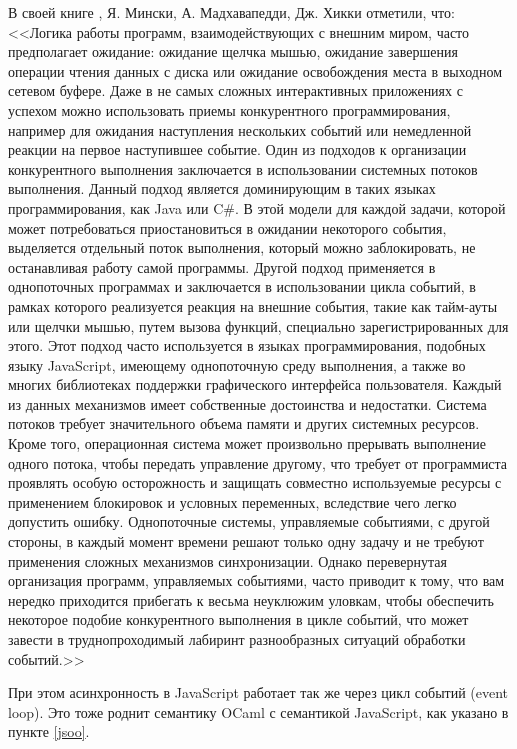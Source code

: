 В своей книге \cite{rwo-ru}, Я. Мински, А. Мадхавапедди, Дж. Хикки отметили, что:
<<Логика работы программ, взаимодействующих с внешним миром, часто предполагает
ожидание: ожидание щелчка мышью, ожидание завершения операции чтения
данных с диска или ожидание освобождения места в выходном сетевом буфере.
Даже в не самых сложных интерактивных приложениях с успехом можно использовать
приемы конкурентного программирования, например для ожидания наступления
нескольких событий или немедленной реакции на первое наступившее событие.
Один из подходов к организации конкурентного выполнения заключается
в использовании системных потоков выполнения. Данный подход является
доминирующим в таких языках программирования, как Java или C\#. В этой модели
для каждой задачи, которой может потребоваться приостановиться в ожидании
некоторого события, выделяется отдельный поток выполнения, который можно
заблокировать, не останавливая работу самой программы.
Другой подход применяется в однопоточных программах и заключается в
использовании цикла событий, в рамках которого реализуется реакция на внешние
события, такие как тайм-ауты или щелчки мышью, путем вызова функций,
специально зарегистрированных для этого. Этот подход часто используется в языках
программирования, подобных языку JavaScript, имеющему однопоточную среду
выполнения, а также во многих библиотеках поддержки графического
интерфейса пользователя.
Каждый из данных механизмов имеет собственные достоинства и недостатки.
Система потоков требует значительного объема памяти и других системных
ресурсов. Кроме того, операционная система может произвольно прерывать
выполнение одного потока, чтобы передать управление другому, что требует
от программиста проявлять особую осторожность и защищать совместно используемые
ресурсы с применением блокировок и условных переменных, вследствие чего
легко допустить ошибку.
Однопоточные системы, управляемые событиями, с другой стороны, в каждый
момент времени решают только одну задачу и не требуют применения сложных
механизмов синхронизации. Однако перевернутая организация программ,
управляемых событиями, часто приводит к тому, что вам нередко приходится прибегать
к весьма неуклюжим уловкам, чтобы обеспечить некоторое подобие
конкурентного выполнения в цикле событий, что может завести в труднопроходимый
лабиринт разнообразных ситуаций обработки событий.>>

При этом асинхронность в JavaScript работает так же через цикл событий (event loop).
Это тоже роднит семантику OCaml с семантикой JavaScript, как указано в пункте \ref{jsoo}.


